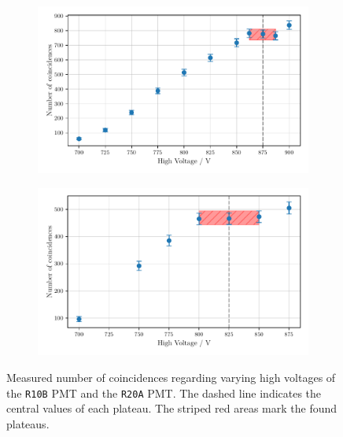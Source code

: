 \begin{figure}
        \centering
        \begin{subfigure}[b]{0.48\textwidth}
        \includegraphics[width=\textwidth]{plots/hvR20A.pdf}
        \label{fig:hvPMT1}
    \end{subfigure}\hfill
\begin{subfigure}[b]{0.48\textwidth}
        \includegraphics[width=\textwidth]{plots/hvR10B.pdf}
        \label{fig:hvPMT2}
\end{subfigure}
\caption{Measured number of coincidences regarding varying high voltages
of the \texttt{R10B} PMT and the \texttt{R20A} PMT.
The dashed line indicates the central values of each plateau. The striped red areas mark the found plateaus.}
\label{fig:hv}
\end{figure}

